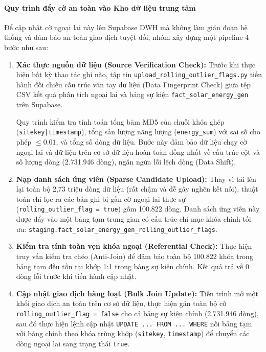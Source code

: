 \documentclass[12pt,a4paper]{article}
\begin{document}
\paragraph{Quy trình đẩy cờ an toàn vào Kho dữ liệu trung tâm}
Để cập nhật cờ ngoại lai này lên Supabase DWH mà không làm gián đoạn hệ thống và đảm bảo an toàn giao dịch tuyệt đối, nhóm xây dựng một pipeline 4 bước như sau:
\begin{enumerate}
    \item \textbf{Xác thực nguồn dữ liệu (Source Verification Check):} Trước khi thực hiện bất kỳ thao tác ghi nào, tập tin \texttt{upload\_rolling\_outlier\_flags.py} tiến hành đối chiếu cấu trúc vân tay dữ liệu (Data Fingerprint Check) giữa tệp CSV kết quả phân tích ngoại lai và bảng sự kiện \texttt{fact\_solar\_energy\_gen} trên Supabase. 
    
    Quy trình kiểm tra tính toán tổng băm MD5 của chuỗi khóa ghép (\texttt{sitekey|timestamp}), tổng sản lượng năng lượng (\texttt{energy\_sum}) với sai số cho phép $\le 0.01$, và tổng số dòng dữ liệu. Bước này đảm bảo dữ liệu chạy cờ ngoại lai và dữ liệu trên cơ sở dữ liệu hoàn toàn đồng nhất về cấu trúc cột và số lượng dòng (2.731.946 dòng), ngăn ngừa lỗi lệch dòng (Data Shift).
    
    \item \textbf{Nạp danh sách ứng viên (Sparse Candidate Upload):} Thay vì tải lên lại toàn bộ 2,73 triệu dòng dữ liệu (rất chậm và dễ gây nghẽn kết nối), thuật toán chỉ lọc ra các bản ghi bị gắn cờ ngoại lai thực sự (\texttt{rolling\_outlier\_flag = true}) gồm 100.822 dòng. Danh sách ứng viên này được đẩy vào một bảng tạm trung gian có cấu trúc chỉ mục khóa chính tối ưu: \texttt{staging.fact\_solar\_energy\_gen\_rolling\_outlier\_flags}.
    
    \item \textbf{Kiểm tra tính toàn vẹn khóa ngoại (Referential Check):} Thực hiện truy vấn kiểm tra chéo (Anti-Join) để đảm bảo toàn bộ 100.822 khóa trong bảng tạm đều tồn tại khớp 1:1 trong bảng sự kiện chính. Kết quả trả về 0 dòng lỗi trước khi tiến hành cập nhật.
    
    \item \textbf{Cập nhật giao dịch hàng loạt (Bulk Join Update):} Tiến trình mở một khối giao dịch an toàn trên cơ sở dữ liệu, thực hiện gán toàn bộ cờ \texttt{rolling\_outlier\_flag = false} cho cả bảng sự kiện chính (2.731.946 dòng), sau đó thực hiện lệnh cập nhật \texttt{UPDATE ... FROM ... WHERE} nối bảng tạm với bảng chính theo khóa trùng khớp (\texttt{sitekey}, \texttt{timestamp}) để chuyển các dòng ngoại lai sang trạng thái \texttt{true}.
\end{enumerate}
\end{document}
